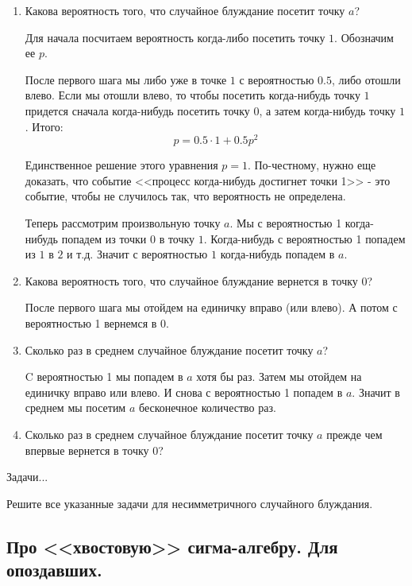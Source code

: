{\begin{enumerate}
\item Какова вероятность того, что случайное блуждание посетит точку $a$?

Для начала посчитаем вероятность когда-либо посетить точку $1$. Обозначим ее $p$.

После первого шага мы либо уже в точке $1$ с вероятностью $0.5$, либо отошли влево. Если мы отошли влево, то чтобы посетить когда-нибудь точку $1$ придется сначала когда-нибудь посетить точку $0$, а затем когда-нибудь точку $1$. Итого:
\begin{equation}
p=0.5\cdot 1 + 0.5 p^{2}
\end{equation}

Единственное решение этого уравнения $p=1$. По-честному, нужно еще доказать, что событие <<процесс когда-нибудь достигнет точки 1>> - это событие, чтобы не случилось так, что вероятность не определена.

Теперь рассмотрим произвольную точку $a$. Мы с вероятностью 1 когда-нибудь попадем из точки $0$ в точку $1$. Когда-нибудь с вероятностью 1 попадем из $1$ в $2$ и т.д. Значит с вероятностью $1$ когда-нибудь попадем в $a$.

\item Какова вероятность того, что случайное блуждание вернется в точку $0$?

После первого шага мы отойдем на единичку вправо (или влево). А потом с вероятностью 1 вернемся в $0$.

\item Сколько раз в среднем случайное блуждание посетит точку $a$?

C вероятностью 1 мы попадем в $ a $ хотя бы раз. Затем мы отойдем на единичку вправо или влево. И снова с вероятностью 1 попадем в $a$. Значит в среднем мы посетим $a$ бесконечное количество раз.

\item Сколько раз в среднем случайное блуждание посетит точку $a$ прежде чем впервые вернется в точку $0$?
\end{enumerate}






Задачи...

Решите все указанные задачи для несимметричного случайного блуждания.










}\subsection{Про <<хвостовую>> сигма-алгебру. Для опоздавших.} \problemtext{

}
